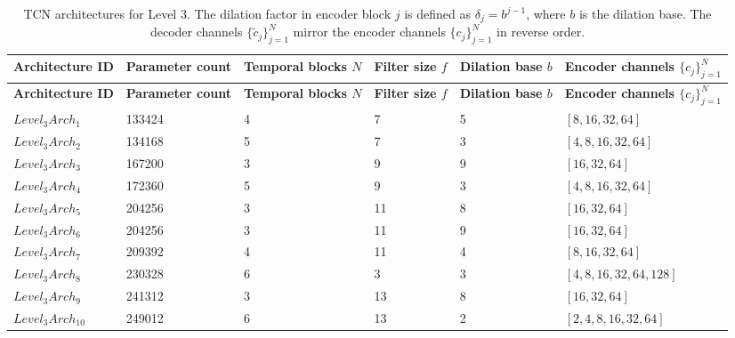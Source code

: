 \documentclass[preprint,12pt]{elsarticle}
\begin{document}
\begin{footnotesize}
\setlength{\tabcolsep}{5pt}
\renewcommand{\arraystretch}{1.3}
\begin{longtable}{p{2.2cm}p{1.8cm}p{1.6cm}p{1.4cm}p{1.6cm}p{2.0cm}}
\caption{TCN architectures for Level 3. The dilation factor in encoder block $j$ is defined as $\delta_j = b^{j-1}$, where $b$ is the dilation base. The decoder channels $\{\tilde{c}_j\}_{j=1}^{N}$ mirror the encoder channels $\{c_j\}_{j=1}^{N}$ in reverse order.}
\label{tab:level3}\\
\toprule
\textbf{Architecture ID} & \textbf{Parameter count} & \textbf{Temporal blocks $N$} & \textbf{Filter size $f$} & \textbf{Dilation base $b$} & \textbf{Encoder channels $\{c_j\}_{j=1}^{N}$} \\
\midrule
\endfirsthead
\toprule
\textbf{Architecture ID} & \textbf{Parameter count} & \textbf{Temporal blocks $N$} & \textbf{Filter size $f$} & \textbf{Dilation base $b$} & \textbf{Encoder channels $\{c_j\}_{j=1}^{N}$} \\
\midrule
\endhead
\endfoot
\bottomrule
\endlastfoot
$Level_3Arch_1$    & 133424 & 4 & 7  & 5 & $[8, 16, 32, 64]$         \\
$Level_3Arch_2$    & 134168 & 5 & 7  & 3 & $[4, 8, 16, 32, 64]$      \\
$Level_3Arch_3$    & 167200 & 3 & 9  & 9 & $[16, 32, 64]$            \\
$Level_3Arch_4$    & 172360 & 5 & 9  & 3 & $[4, 8, 16, 32, 64]$      \\
$Level_3Arch_5$    & 204256 & 3 & 11 & 8 & $[16, 32, 64]$            \\
$Level_3Arch_6$    & 204256 & 3 & 11 & 9 & $[16, 32, 64]$            \\
$Level_3Arch_7$    & 209392 & 4 & 11 & 4 & $[8, 16, 32, 64]$         \\
$Level_3Arch_8$    & 230328 & 6 & 3  & 3 & $[4, 8, 16, 32, 64, 128]$ \\
$Level_3Arch_9$    & 241312 & 3 & 13 & 8 & $[16, 32, 64]$            \\
$Level_3Arch_{10}$ & 249012 & 6 & 13 & 2 & $[2, 4, 8, 16, 32, 64]$   \\
\end{longtable}
\end{footnotesize}
\end{document}
